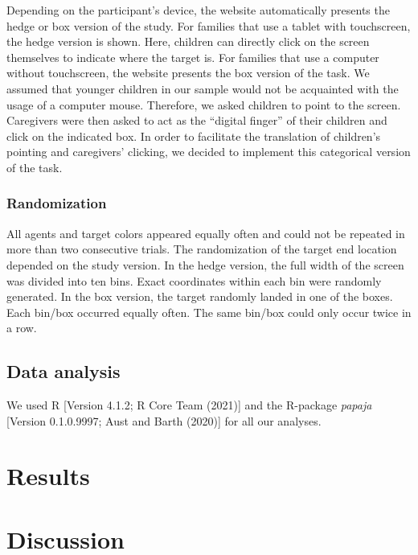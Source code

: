 \documentclass[
  english,
  man,floatsintext]{apa6}
\begin{document}
Depending on the participant's device, the website automatically presents the hedge or box version of the study. For families that use a tablet with touchscreen, the hedge version is shown. Here, children can directly click on the screen themselves to indicate where the target is. For families that use a computer without touchscreen, the website presents the box version of the task. We assumed that younger children in our sample would not be acquainted with the usage of a computer mouse. Therefore, we asked children to point to the screen. Caregivers were then asked to act as the ``digital finger'' of their children and click on the indicated box. In order to facilitate the translation of children's pointing and caregivers' clicking, we decided to implement this categorical version of the task.

\hypertarget{randomization}{%
\subsubsection{Randomization}\label{randomization}}

All agents and target colors appeared equally often and could not be repeated in more than two consecutive trials. The randomization of the target end location depended on the study version. In the hedge version, the full width of the screen was divided into ten bins. Exact coordinates within each bin were randomly generated. In the box version, the target randomly landed in one of the boxes. Each bin/box occurred equally often. The same bin/box could only occur twice in a row.

\hypertarget{data-analysis}{%
\subsection{Data analysis}\label{data-analysis}}

We used R {[}Version 4.1.2; R Core Team (2021){]} and the R-package \emph{papaja} {[}Version 0.1.0.9997; Aust and Barth (2020){]} for all our analyses.

\hypertarget{results}{%
\section{Results}\label{results}}

\hypertarget{discussion}{%
\section{Discussion}\label{discussion}}
\end{document}
